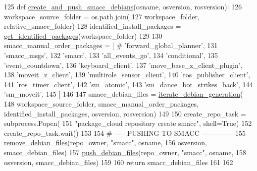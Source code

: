 \begin{DoxyCode}
125 \textcolor{keyword}{def }\hyperlink{namespacegenerate__debs_af7237c463c8e5b4df369e6befc154c50}{create\_and\_push\_smacc\_debians}(osname, osversion, rosversion):
126     workspace\_source\_folder = os.path.join(
127         workspace\_folder, relative\_smacc\_folder)
128     identified\_install\_packages = \hyperlink{namespacegenerate__debs_aa91b87c6d9c3ed04015845cc9298431a}{get\_identified\_packages}(workspace\_folder)
129 
130     smacc\_manual\_order\_packages = [  \textcolor{comment}{# 'forward\_global\_planner',}
131         \textcolor{stringliteral}{'smacc\_msgs'},
132         \textcolor{stringliteral}{'smacc'},
133         \textcolor{stringliteral}{'all\_events\_go'},
134         \textcolor{stringliteral}{'conditional'},
135         \textcolor{stringliteral}{'event\_countdown'},
136         \textcolor{stringliteral}{'keyboard\_client'},
137         \textcolor{stringliteral}{'move\_base\_z\_client\_plugin'},
138         \textcolor{stringliteral}{'moveit\_z\_client'},
139         \textcolor{stringliteral}{'multirole\_sensor\_client'},
140         \textcolor{stringliteral}{'ros\_publisher\_client'},
141         \textcolor{stringliteral}{'ros\_timer\_client'},
142         \textcolor{stringliteral}{'sm\_atomic'},
143         \textcolor{stringliteral}{'sm\_dance\_bot\_strikes\_back'},
144         \textcolor{stringliteral}{'sm\_moveit'},
145     ]
146 
147     smacc\_debian\_files = \hyperlink{namespacegenerate__debs_a2615a6fc7860b6aa9e920e6b4d886589}{iterate\_debian\_generation}(
148         workspace\_source\_folder, smacc\_manual\_order\_packages, identified\_install\_packages, osversion, 
      rosversion)
149 
150     create\_repo\_task = subprocess.Popen(
151         \textcolor{stringliteral}{"package\_cloud repository create smacc"}, shell=\textcolor{keyword}{True})
152     create\_repo\_task.wait()
153 
154     \textcolor{comment}{# ----- PUSHING TO SMACC --------------}
155     \hyperlink{namespacegenerate__debs_a08095040d038b3613ad0e77fd4e7f60e}{remove\_debian\_files}(repo\_owner, \textcolor{stringliteral}{"smacc"},  osname,
156                         osversion, smacc\_debian\_files)
157     \hyperlink{namespacegenerate__debs_a9b22f5ad65b40b7903c467eda308e575}{push\_debian\_files}(repo\_owner, \textcolor{stringliteral}{"smacc"},  osname,
158                       osversion, smacc\_debian\_files)
159 
160     \textcolor{keywordflow}{return} smacc\_debian\_files
161 
162 
\end{DoxyCode}


